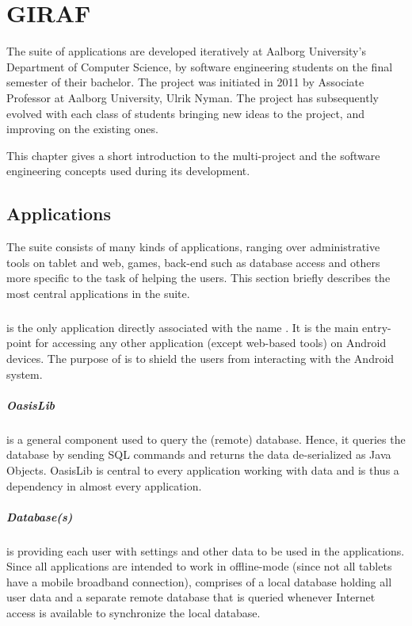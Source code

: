 \chapter{GIRAF}\label{chap:giraf}
The suite of \giraf applications are developed iteratively at Aalborg University's Department of Computer Science, by software engineering students on the final semester of their bachelor.
The project was initiated in 2011 by Associate Professor at Aalborg University, Ulrik Nyman.
The project has subsequently evolved with each class of students bringing new ideas to the project, and improving on the existing ones.

This chapter gives a short introduction to the \giraf multi-project and the software engineering concepts used during its development.

\section{\giraf Applications}\label{sec:giraf:applications}
The \giraf suite consists of many kinds of applications, ranging over administrative tools on tablet and web, games, back-end such as database access and others more specific to the task of helping the users.
This section briefly describes the most central applications in the \giraf suite.

\paragraph{\launcher}
is the only application directly associated with the name \giraf.
It is the main entry-point for accessing any other application (except web-based tools) on Android devices.
The purpose of \launcher is to shield the users from interacting with the Android system.

\paragraph{OasisLib}
is a general component used to query the (remote) database.
Hence, it queries the database by sending SQL commands and returns the data de-serialized as Java Objects.
OasisLib is central to every \giraf application working with data and is thus a dependency in almost every application.

\paragraph{Database(s)}
is providing each user with settings and other data to be used in the \giraf applications.
Since all applications are intended to work in offline-mode (since not all tablets have a mobile broadband connection), \giraf comprises of a local database holding all user data and a separate remote database that is queried whenever Internet access is available to synchronize the local database. 

